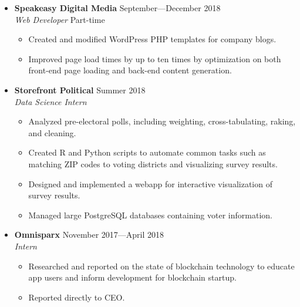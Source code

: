 \documentclass[12pt,letterpaper]{article}
\newenvironment{explist}
{\begin{itemize}[label=\textbf{--},itemsep=1pt,topsep=0pt,partopsep=0pt,parsep=0pt]}
{\end{itemize}}
\begin{document}
\begin{itemize}[label=]
    \item
        \textbf{Speakeasy Digital Media} \hfill September---December 2018\\
        \textit{Web Developer} \hfill Part-time
        \begin{explist}
        \item Created and modified WordPress PHP templates for company blogs.
        \item Improved page load times by up to ten times by optimization on both front-end page loading and back-end content generation.
        \end{explist}

    \item
        \textbf{Storefront Political} \hfill Summer 2018\\
        \textit{Data Science Intern}
        \begin{explist}
        \item Analyzed pre-electoral polls, including weighting, cross-tabulating, raking, and cleaning.
        \item Created R and Python scripts to automate common tasks such as matching ZIP codes to voting districts and visualizing survey results.
        \item Designed and implemented a webapp for interactive visualization of survey results.
        \item Managed large PostgreSQL databases containing voter information.
        \end{explist}

    \item
        \textbf{Omnisparx} \hfill November 2017---April 2018\\
        \textit{Intern}
        \begin{explist}
        \item Researched and reported on the state of blockchain technology to educate app users and inform development for blockchain startup.
        \item Reported directly to CEO.
        \end{explist}

\end{itemize}

\end{document}

